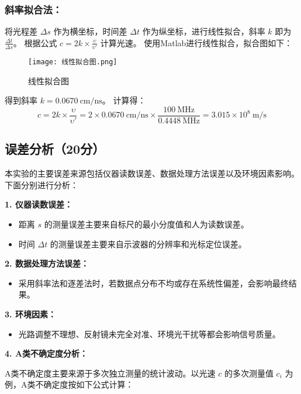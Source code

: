 \documentclass{Phyport}
\begin{document}
\subsubsection{斜率拟合法：}将光程差 $\Delta s$ 作为横坐标，时间差 $\Delta t$ 作为纵坐标，进行线性拟合，斜率 $k$ 即为 $\frac{\Delta t}{\Delta s}$。
根据公式 $c = 2k \times \frac{\upsilon}{\upsilon'}$ 计算光速。
使用Matlab进行线性拟合，拟合图如下：

\begin{figure}[H]
    \centering
    \texttt{[image: 线性拟合图.png]}
    \caption{线性拟合图}
    \label{fig:线性拟合图}
\end{figure}

得到斜率 $k = 0.0670\ \mathrm{cm/ns}$。
计算得：
\begin{equation}
    c = 2k \times \frac{\upsilon}{\upsilon'} = 2 \times 0.0670\ \mathrm{cm/ns} \times \frac{100\ \mathrm{MHz}}{0.4448\ \mathrm{MHz}} = 3.015\times 10^8\ \mathrm{m/s}
\end{equation}

\newpage

\subsection{误差分析（20分）}
本实验的主要误差来源包括仪器读数误差、数据处理方法误差以及环境因素影响。下面分别进行分析：

\textbf{1. 仪器读数误差：}
\begin{itemize}
    \item 距离 $s$ 的测量误差主要来自标尺的最小分度值和人为读数误差。
    \item 时间 $\Delta t$ 的测量误差主要来自示波器的分辨率和光标定位误差。
\end{itemize}

\textbf{2. 数据处理方法误差：}
\begin{itemize}
    \item 采用斜率法和逐差法时，若数据点分布不均或存在系统性偏差，会影响最终结果。
\end{itemize}

\textbf{3. 环境因素：}
\begin{itemize}
    \item 光路调整不理想、反射镜未完全对准、环境光干扰等都会影响信号质量。
\end{itemize}

\textbf{4. A类不确定度分析：}

A类不确定度主要来源于多次独立测量的统计波动。以光速 $c$ 的多次测量值 $c_i$ 为例，A类不确定度按如下公式计算：
\end{document}
